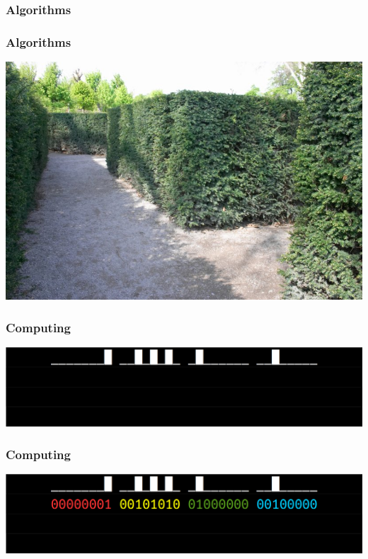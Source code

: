 \documentclass[11pt]{beamer}
\begin{document}
\begin{frame}[fragile]
  \frametitle{Algorithms}
\end{frame}

\begin{frame}[fragile]
  \frametitle{Algorithms}

  \includegraphics[height=0.75\textheight]{./img/hedge-maze.jpg}
\end{frame}

\begin{frame}[fragile]
  \frametitle{Computing}

  \includegraphics[width=\textwidth]{./img/assembler-1.png}
\end{frame}

\begin{frame}[fragile]
  \frametitle{Computing}

  \includegraphics[width=\textwidth]{./img/assembler-2.png}
\end{frame}
\end{document}
